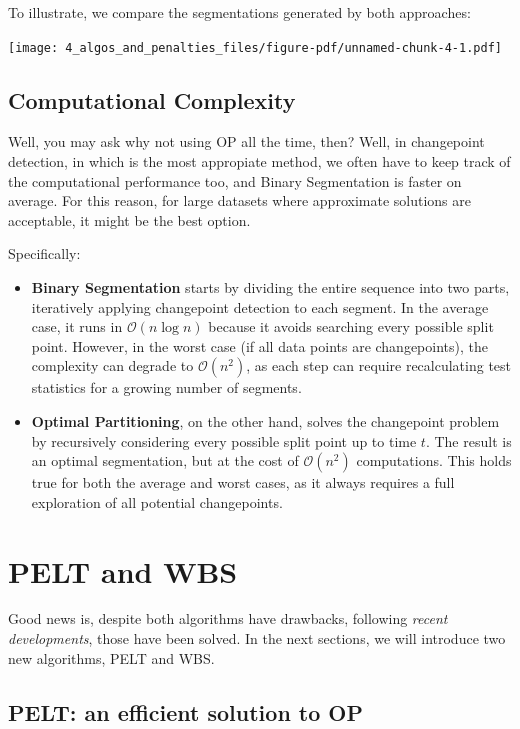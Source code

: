\documentclass[
  letterpaper,
  DIV=11,
  numbers=noendperiod]{scrreprt}
\begin{document}
To illustrate, we compare the segmentations generated by both
approaches:

\texttt{[image: 4\_algos\_and\_penalties\_files/figure-pdf/unnamed-chunk-4-1.pdf]}

\subsection{Computational Complexity}\label{computational-complexity}

Well, you may ask why not using OP all the time, then? Well, in
changepoint detection, in which is the most appropiate method, we often
have to keep track of the computational performance too, and Binary
Segmentation is faster on average. For this reason, for large datasets
where approximate solutions are acceptable, it might be the best option.

Specifically:

\begin{itemize}
\item
  \textbf{Binary Segmentation} starts by dividing the entire sequence
  into two parts, iteratively applying changepoint detection to each
  segment. In the average case, it runs in \(\mathcal{O}(n \log n)\)
  because it avoids searching every possible split point. However, in
  the worst case (if all data points are changepoints), the complexity
  can degrade to \(\mathcal{O}(n^2)\), as each step can require
  recalculating test statistics for a growing number of segments.
\item
  \textbf{Optimal Partitioning}, on the other hand, solves the
  changepoint problem by recursively considering every possible split
  point up to time \(t\). The result is an optimal segmentation, but at
  the cost of \(\mathcal{O}(n^2)\) computations. This holds true for
  both the average and worst cases, as it always requires a full
  exploration of all potential changepoints.
\end{itemize}

\section{PELT and WBS}\label{pelt-and-wbs}

Good news is, despite both algorithms have drawbacks, following
\emph{recent developments}, those have been solved. In the next
sections, we will introduce two new algorithms, PELT and WBS.

\subsection{PELT: an efficient solution to
OP}\label{pelt-an-efficient-solution-to-op}
\end{document}
